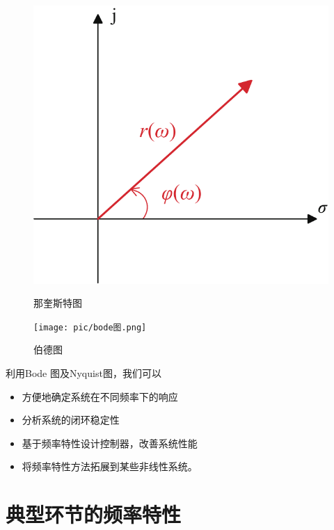 \begin{figure}[!htb]
		\begin{minipage}{0.45\linewidth}
		\centering
		\includegraphics[width=0.9\linewidth]{pic/那奎斯特图.pdf}
		\caption{那奎斯特图}
		\label{那奎斯特图}
	\end{minipage}
	\begin{minipage}{0.55\linewidth}
		\centering
		\texttt{[image: pic/bode图.png]}
		\vspace*{-0.2em}
		\caption{伯德图}
		\label{bode图}
	\end{minipage}
\end{figure}

\newpage
\noindent 利用Bode 图及Nyquist图，我们可以
\begin{itemize}
	\item 方便地确定系统在不同频率下的响应
	\item 分析系统的闭环稳定性
	\item 基于频率特性设计控制器，改善系统性能
	\item 将频率特性方法拓展到某些非线性系统。
\end{itemize}


\section{典型环节的频率特性}
